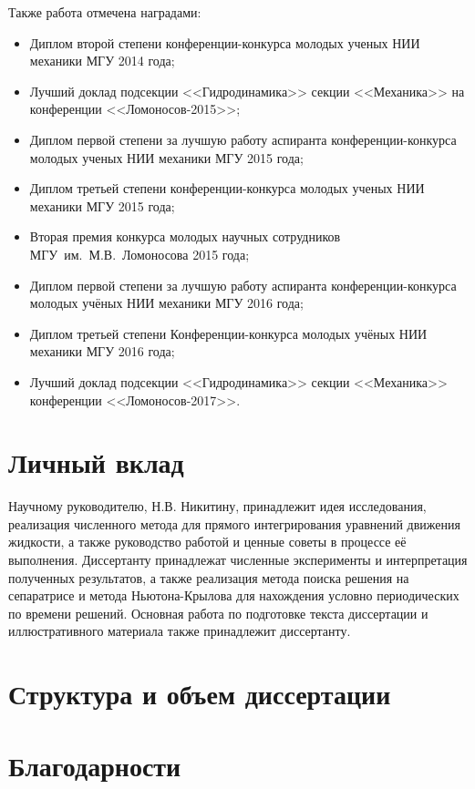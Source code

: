 Также работа отмечена наградами:
\begin{itemize}
\item Диплом второй степени конференции-конкурса молодых ученых НИИ механики МГУ 2014 года;
\item Лучший доклад подсекции <<Гидродинамика>> секции <<Механика>> на конференции <<Ломоносов-2015>>;
\item Диплом первой степени за лучшую работу аспиранта конференции-конкурса молодых ученых НИИ механики МГУ 2015 года;
\item Диплом третьей степени конференции-конкурса молодых ученых НИИ механики МГУ 2015 года;
\item Вторая премия конкурса молодых научных сотрудников МГУ~им.~М.В.~Ломоносова 2015 года;
\item Диплом первой степени за лучшую работу аспиранта конференции-конкурса молодых учёных НИИ механики МГУ 2016 года;
\item Диплом третьей степени Конференции-конкурса молодых учёных НИИ механики МГУ 2016 года;
\item Лучший доклад подсекции <<Гидродинамика>> секции <<Механика>> конференции <<Ломоносов-2017>>.
\end{itemize}


\section{Личный вклад}

Научному руководителю, Н.В. Никитину, принадлежит идея исследования, реализация численного метода для прямого интегрирования уравнений движения жидкости, а также руководство работой и ценные советы в процессе её выполнения. Диссертанту принадлежат численные эксперименты и интерпретация полученных результатов, а также реализация метода поиска решения на сепаратрисе и метода Ньютона-Крылова для нахождения условно периодических по времени решений. Основная работа по подготовке текста диссертации и иллюстративного материала также принадлежит диссертанту.


\section{Структура и объем диссертации}

\section{Благодарности}


